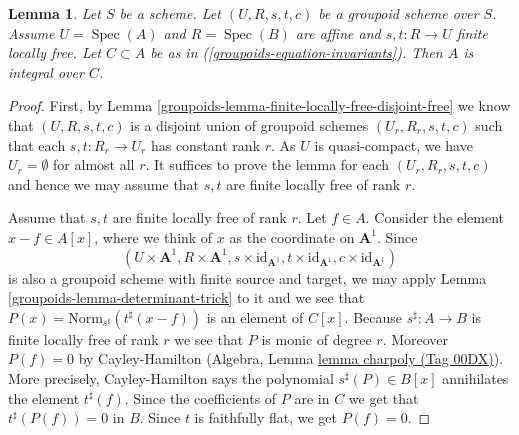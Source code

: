 \documentclass{amsart}
\theoremstyle{plain}
\newtheorem{lemma}[subsection]{Lemma}
\theoremstyle{definition}
\theoremstyle{remark}
\numberwithin{equation}{subsection}
\def\Spec{\mathop{\mathrm{Spec}}}
\begin{document}
\begin{lemma}
\label{groupoids-lemma-integral-over-invariants}
Let $S$ be a scheme. Let $(U, R, s, t, c)$ be a groupoid scheme over $S$.
Assume $U = \Spec(A)$ and $R = \Spec(B)$ are affine and
$s, t : R \to U$ finite locally free.
Let $C \subset A$ be as in (\ref{groupoids-equation-invariants}).
Then $A$ is integral over $C$.
\end{lemma}

\begin{proof}
First, by Lemma \ref{groupoids-lemma-finite-locally-free-disjoint-free}
we know that $(U, R, s, t, c)$ is a disjoint union
of groupoid schemes $(U_r, R_r, s, t, c)$ such that each $s, t : R_r \to U_r$
has constant rank $r$. As $U$ is quasi-compact, we have $U_r = \emptyset$ for
almost all $r$. It suffices to prove the lemma for each $(U_r, R_r, s, t, c)$
and hence we may assume that $s, t$ are finite locally free of rank $r$.

\medskip\noindent
Assume that $s, t$ are finite locally free of rank $r$.
Let $f \in A$. Consider the element $x - f \in A[x]$, where we think
of $x$ as the coordinate on $\mathbf{A}^1$.
Since
$$
(U \times \mathbf{A}^1, R \times \mathbf{A}^1,
s \times \text{id}_{\mathbf{A}^1},
t \times \text{id}_{\mathbf{A}^1},
c \times \text{id}_{\mathbf{A}^1})
$$
is also a groupoid scheme with finite source and target, we may apply
Lemma \ref{groupoids-lemma-determinant-trick} to it and we see that
$P(x) = \text{Norm}_{s^\sharp}(t^\sharp(x - f))$
is an element of $C[x]$. Because $s^\sharp : A \to B$ is finite locally
free of rank $r$ we see that $P$ is monic of degree $r$.
Moreover $P(f) = 0$ by Cayley-Hamilton
(Algebra, Lemma \href{https://stacks.math.columbia.edu/tag/00DX}{lemma charpoly (Tag 00DX)}).
More precisely, Cayley-Hamilton says the polynomial
$s^\sharp(P) \in B[x]$ annihilates the element $t^\sharp(f)$.
Since the coefficients of $P$ are in $C$ we get that
$t^\sharp(P(f)) = 0$ in $B$. Since $t$ is faithfully flat,
we get $P(f) = 0$.
\end{proof}
\end{document}

